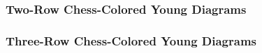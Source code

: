 
\newpage
\subsubsection{Two-Row Chess-Colored Young Diagrams}

\newpage
\subsubsection{Three-Row Chess-Colored Young Diagrams}
